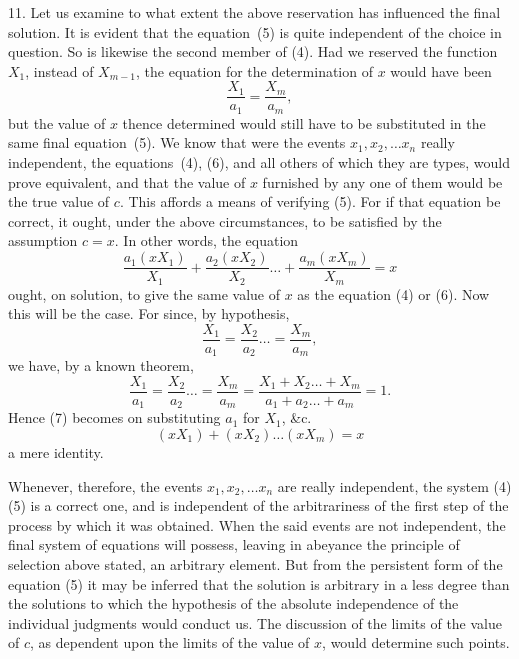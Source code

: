 \documentclass[oneside]{book}
\begin{document}
11. Let us examine to what extent the above reservation has
influenced the final solution. It is evident that the equation~(5)
is quite independent of the choice in question. So is likewise
the second member of (4). Had we reserved the function $X_1$,
instead of $X_{m-1}$, the equation for the determination of $x$ would
have been
\[
  \frac{X_1}{a_1} = \frac{X_m}{a_m},   \tag{6}
\]
but the value of $x$ thence determined would still have to be substituted
in the same final equation~(5). We know that were
the events $x_1, x_2,\dotsc x_n$ really independent, the equations~(4),
(6), and all others of which they are types, would prove equivalent, and
that the value of $x$ furnished by any one of them
would be the true value of $c$. This affords a means of verifying
(5). For if that equation be correct, it ought, under the above
circumstances, to be satisfied by the assumption $c = x$. In other
words, the equation
\[
  \frac{a_1(x X_1)}{X_1}
+ \frac{a_2(x X_2)}{X_2} \dotsc
+ \frac{a_m(x X_m)}{X_m} = x     \tag{7}
\]
ought, on solution, to give the same value of $x$ as the equation
(4) or (6). Now this will be the case. For since, by hypothesis,
\[
  \frac{X_1}{a_1} = \frac{X_2}{a_2} \dotso = \frac{X_m}{a_m},
\]
we have, by a known theorem,
\[
  \frac{X_1}{a_1} = \frac{X_2}{a_2} \dotso = \frac{X_m}{a_m}
= \frac{X_1 + X_2 \dotsc + X_m}{a_1 + a_2 \dotsc + a_m}
= 1.
\]
Hence (7) becomes on substituting $a_1$ for $X_1$, \&c.
\[
  (xX_1) + (xX_2)\dotsc (xX_m) = x
\]
a mere identity.

Whenever, therefore, the events $x_1, x_2,\dotsc x_n$ are really
independent, the system (4) (5) is a correct one, and is independent
of the arbitrariness of the first step of the process by which it
was obtained. When the said events are not independent, the
final system of equations will possess, leaving in abeyance the
principle of selection above stated, an arbitrary element. But
from the persistent form of the equation (5) it may be inferred
that the solution is arbitrary in a less degree than the solutions
to which the hypothesis of the absolute independence of the individual
judgments would conduct us. The discussion of the
limits of the value of $c$, as dependent upon the limits of the value
of $x$, would determine such points.
\end{document}
